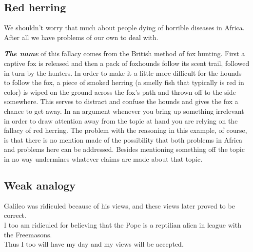 \documentclass[12pt, openany]{book}
\begin{document}
\hypertarget{red-herring}{%
\subsection*{Red herring}\label{red-herring}}


\begin{center}

\begin{argument}

We shouldn't worry that much about people dying of horrible diseases in Africa.\\

After all we have problems of our own to deal with.

\end{argument}

\end{center}

\textbf{\emph{The name}} of this fallacy comes from the British method of fox hunting. First a captive fox is released and then a pack of foxhounds follow its scent trail, followed in turn by the hunters. In order to make it a little more difficult for the hounds to follow the fox, a piece of smoked herring (a smelly fish that typically is red in color) is wiped on the ground across the fox's path and thrown off to the side somewhere. This serves to distract and confuse the hounds and gives the fox a chance to get away. In an argument whenever you bring up something irrelevant in order to draw attention away from the topic at hand you are relying on the fallacy of red herring. The problem with the reasoning in this example, of course, is that there is no mention made of the possibility that both problems in Africa and problems here can be addressed. Besides mentioning something off the topic in no way undermines whatever claims are made about that topic.

\hypertarget{weak-analogy}{%
\subsection*{Weak analogy}\label{weak-analogy}}


\begin{center}

\begin{argument}

Galileo was ridiculed because of his views, and these views later proved to be correct.\\
I too am ridiculed for believing that the Pope is a reptilian alien in league with the Freemasons.\\

Thus I too will have my day and my views will be accepted.

\end{argument}

\end{center}
\end{document}

